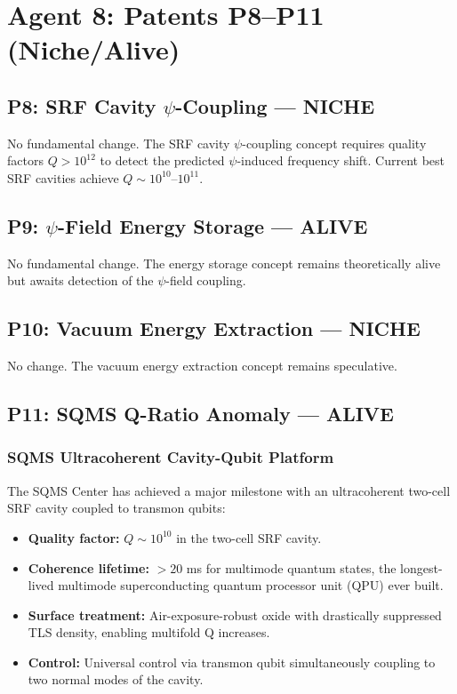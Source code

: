 \documentclass[11pt]{article}
\begin{document}
\section{Agent 8: Patents P8--P11 (Niche/Alive)}
\label{sec:P11}

\subsection{P8: SRF Cavity $\psi$-Coupling --- NICHE}

No fundamental change. The SRF cavity $\psi$-coupling concept requires
quality factors $Q > 10^{12}$ to detect the predicted $\psi$-induced
frequency shift. Current best SRF cavities achieve $Q \sim 10^{10}$--$10^{11}$.

\subsection{P9: $\psi$-Field Energy Storage --- ALIVE}

No fundamental change. The energy storage concept remains theoretically
alive but awaits detection of the $\psi$-field coupling.

\subsection{P10: Vacuum Energy Extraction --- NICHE}

No change. The vacuum energy extraction concept remains speculative.

\subsection{P11: SQMS Q-Ratio Anomaly --- ALIVE}

\subsubsection{SQMS Ultracoherent Cavity-Qubit Platform}

The SQMS Center has achieved a major milestone with an ultracoherent
two-cell SRF cavity coupled to transmon qubits:

\begin{itemize}
  \item \textbf{Quality factor:} $Q \sim 10^{10}$ in the two-cell
    SRF cavity.
  \item \textbf{Coherence lifetime:} $> 20$ ms for multimode quantum
    states, the longest-lived multimode superconducting quantum
    processor unit (QPU) ever built.
  \item \textbf{Surface treatment:} Air-exposure-robust oxide with
    drastically suppressed TLS density, enabling multifold Q increases.
  \item \textbf{Control:} Universal control via transmon qubit
    simultaneously coupling to two normal modes of the cavity.
\end{itemize}
\end{document}
